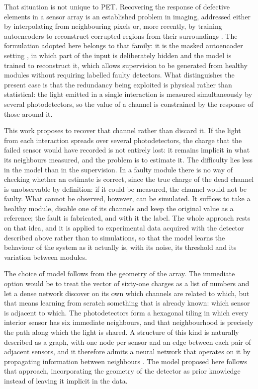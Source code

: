 \documentclass[10pt,conference]{IEEEtran}
\begin{document}
That situation is not unique to PET. Recovering the response of defective
elements in a sensor array is an established problem in imaging, addressed
either by interpolating from neighbouring pixels or, more recently, by
training autoencoders to reconstruct corrupted regions from their
surroundings \cite{fixpix2023}. The formulation adopted here belongs to that
family: it is the masked autoencoder setting \cite{he2022mae}, in which part
of the input is deliberately hidden and the model is trained to reconstruct
it, which allows supervision to be generated from healthy modules without
requiring labelled faulty detectors. What distinguishes the present case is
that the redundancy being exploited is physical rather than statistical: the
light emitted in a single interaction is measured simultaneously by several
photodetectors, so the value of a channel is constrained by the response of
those around it.

This work proposes to recover that channel rather than discard it. If the
light from each interaction spreads over several photodetectors, the charge
that the failed sensor would have recorded is not entirely lost: it remains
implicit in what its neighbours measured, and the problem is to estimate it.
The difficulty lies less in the model than in the supervision. In a faulty
module there is no way of checking whether an estimate is correct, since the
true charge of the dead channel is unobservable by definition: if it could
be measured, the channel would not be faulty. What cannot be observed,
however, can be simulated. It suffices to take a healthy module, disable one
of its channels and keep the original value as a reference; the fault is
fabricated, and with it the label. The whole approach rests on that idea,
and it is applied to experimental data acquired with the detector described
above rather than to simulations, so that the model learns the behaviour of
the system as it actually is, with its noise, its threshold and its
variation between modules.

The choice of model follows from the geometry of the array. The immediate
option would be to treat the vector of sixty-one charges as a list of
numbers and let a dense network discover on its own which channels are
related to which, but that means learning from scratch something that is
already known: which sensor is adjacent to which. The photodetectors form a
hexagonal tiling in which every interior sensor has six immediate
neighbours, and that neighbourhood is precisely the path along which the
light is shared. A structure of this kind is naturally described as a graph,
with one node per sensor and an edge between each pair of adjacent sensors,
and it therefore admits a neural network that operates on it by propagating
information between neighbours \cite{hamilton2017graphsage}. The model
proposed here follows that approach, incorporating the geometry of the
detector as prior knowledge instead of leaving it implicit in the data.
\end{document}

